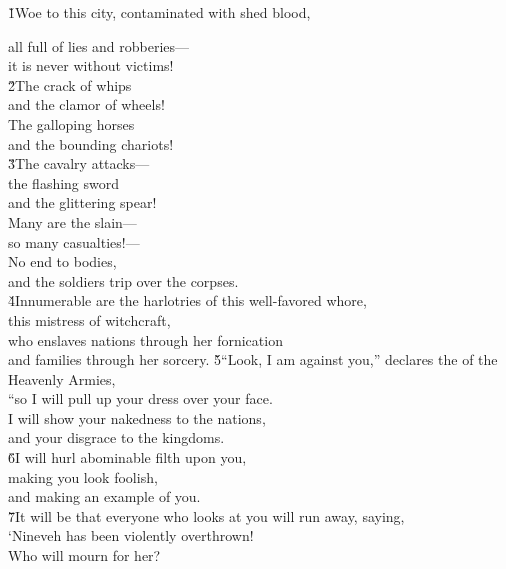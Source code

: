 \v{1}Woe to this city, contaminated with shed blood,

\begin{poetry}
\poeml all full of lies and robberies--- \\
\poemlll       it is never without victims! \\
\poeml \v{2}The crack of whips \\
\poemll    and the clamor of wheels! \\
\poeml The galloping horses \\
\poemll    and the bounding chariots! \\
\poeml \v{3}The cavalry attacks--- \\
\poemll    the flashing sword \\
\poemlll       and the glittering spear! \\
\poeml Many are the slain--- \\
\poemll    so many casualties!--- \\
\poeml No end to bodies, \\
\poemll    and the soldiers trip over the corpses. \\
\poeml \v{4}Innumerable are the harlotries of this well-favored whore, \\
\poemll    this mistress of witchcraft, \\
\poeml who enslaves nations through her fornication \\
\poemll    and families through her sorcery.
\poeml \v{5}``Look, I am against you,'' declares the  of the Heavenly Armies, \\
\poemll    ``so I will pull up your dress over your face. \\
\poeml I will show your nakedness to the nations, \\
\poemll    and your disgrace to the kingdoms. \\
\poeml \v{6}I will hurl abominable filth upon you, \\
\poemll    making you look foolish, \\
\poemlll       and making an example of you. \\
\poeml \v{7}It will be that everyone who looks at you will run away, saying, \\
\poemll    `Nineveh has been violently overthrown! \\
\poemlll       Who will mourn for her? \\

\end{poetry}
